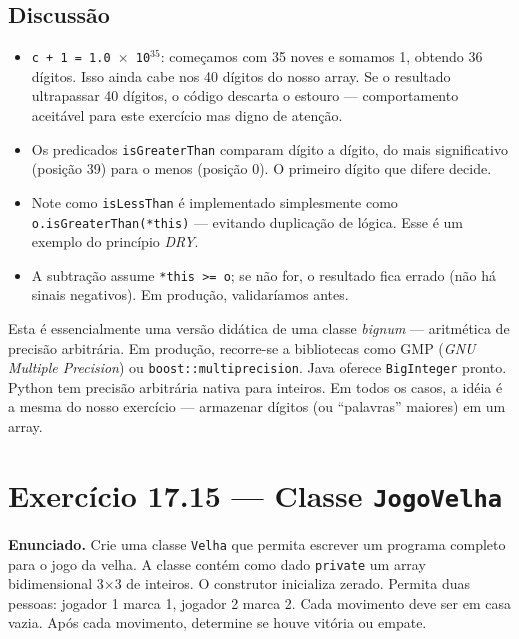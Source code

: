 \documentclass[11pt,a4paper]{article}
\begin{document}
\subsection*{Discuss\~ao}

\begin{itemize}[leftmargin=*]
  \item \texttt{c + 1 = 1.0 $\times$ 10$^{35}$}: come\c{c}amos com 35 noves e somamos 1, obtendo 36 d\'igitos. Isso ainda cabe nos 40 d\'igitos do nosso array. Se o resultado ultrapassar 40 d\'igitos, o c\'odigo descarta o estouro --- comportamento aceit\'avel para este exerc\'icio mas digno de aten\c{c}\~ao.
  \item Os predicados \texttt{isGreaterThan} comparam d\'igito a d\'igito, do mais significativo (posi\c{c}\~ao 39) para o menos (posi\c{c}\~ao 0). O primeiro d\'igito que difere decide.
  \item Note como \texttt{isLessThan} \'e implementado simplesmente como \texttt{o.isGreaterThan(*this)} --- evitando duplica\c{c}\~ao de l\'ogica. Esse \'e um exemplo do princ\'ipio \emph{DRY}.
  \item A subtra\c{c}\~ao assume \texttt{*this >= o}; se n\~ao for, o resultado fica errado (n\~ao h\'a sinais negativos). Em produ\c{c}\~ao, validar\'iamos antes.
\end{itemize}

\begin{obseng}
Esta \'e essencialmente uma vers\~ao did\'atica de uma classe \emph{bignum} --- aritm\'etica de precis\~ao arbitr\'aria. Em produ\c{c}\~ao, recorre-se a bibliotecas como GMP (\emph{GNU Multiple Precision}) ou \texttt{boost::multiprecision}. Java oferece \texttt{BigInteger} pronto. Python tem precis\~ao arbitr\'aria nativa para inteiros. Em todos os casos, a id\'eia \'e a mesma do nosso exerc\'icio --- armazenar d\'igitos (ou ``palavras'' maiores) em um array.
\end{obseng}

\newpage
\section{Exerc\'icio 17.15 --- Classe \texttt{JogoVelha}}

\begin{enunciado}
\textbf{Enunciado.} Crie uma classe \texttt{Velha} que permita escrever um programa completo para o jogo da velha. A classe cont\'em como dado \texttt{private} um array bidimensional 3$\times$3 de inteiros. O construtor inicializa zerado. Permita duas pessoas: jogador 1 marca 1, jogador 2 marca 2. Cada movimento deve ser em casa vazia. Ap\'os cada movimento, determine se houve vit\'oria ou empate.
\end{enunciado}
\end{document}
